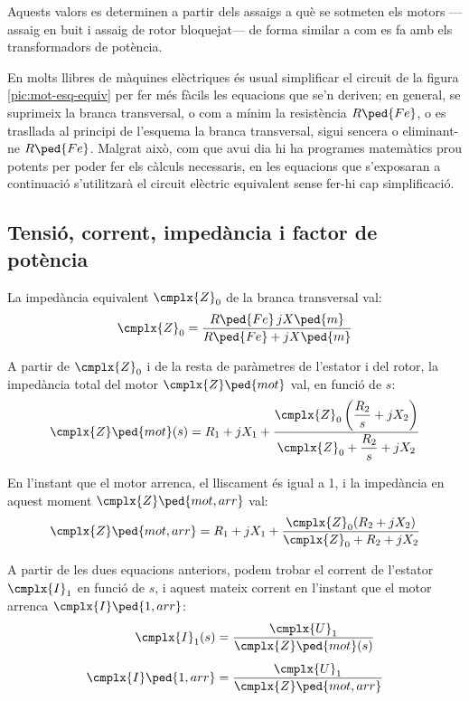 Aquests valors es determinen a partir dels assaigs a què se sotmeten els motors ---assaig en buit i assaig de rotor bloquejat--- de forma similar a com es fa amb els transformadors de potència.

En molts llibres de màquines elèctriques és usual simplificar el circuit de la figura  \vref{pic:mot-esq-equiv} per fer més fàcils les equacions que se'n deriven; en general, se suprimeix la branca transversal, o com a mínim la resistència $R\ped{Fe}$, o es trasllada al principi de l'esquema la branca transversal, sigui sencera o eliminant-ne  $R\ped{Fe}$. Malgrat això, com que avui dia hi ha programes matemàtics prou potents per poder fer els càlculs necessaris, en les equacions que s'exposaran a continuació s'utilitzarà el circuit elèctric equivalent sense fer-hi cap simplificació.

\subsection{Tensió, corrent, impedància i factor de potència}\label{sec:mot-u-c-i}

La impedància equivalent $\cmplx{Z}_0$ de la branca transversal val:
\begin{equation}\label{eq:mot-Z0}
    \cmplx{Z}_0 = \frac{R\ped{Fe} \, j X\ped{m}}{ R\ped{Fe} + j X\ped{m}}
\end{equation}

A partir de $\cmplx{Z}_0$ i de la resta de paràmetres de l'estator i del rotor, la impedància total del motor $\cmplx{Z}\ped{mot}$ val,  en funció de $s$:
\begin{equation}\label{eq:mot-Zmot}\index{motors d'inducció!impedància}
    \cmplx{Z}\ped{mot}(s) = R_1 + j X_1 + \frac{\cmplx{Z}_0 \left( \dfrac{R_2}{s} + j X_2\right)}{\cmplx{Z}_0 +  \dfrac{R_2}{s} + j X_2}
\end{equation}

En l'instant que el motor arrenca, el lliscament és igual a 1, i la impedància en aquest moment $\cmplx{Z}\ped{mot,arr}$ val:
\begin{equation}\label{eq:z-mot-arr}
    \cmplx{Z}\ped{mot,arr} = R_1 + j X_1 + \frac{\cmplx{Z}_0 ( R_2 + j X_2)}{\cmplx{Z}_0 +  R_2 + j X_2}
\end{equation}

A partir de les dues equacions anteriors, podem trobar el corrent de l'estator  $\cmplx{I}_1$ en funció de $s$, i aquest mateix corrent en l'instant que el motor arrenca $\cmplx{I}\ped{1,arr}$:
\begin{subequations}\index{motors d'inducció!corrent d'arrencada}\index{motors d'inducció!corrent}
\begin{align}
    \cmplx{I}_1(s) &= \frac{\cmplx{U}_1}{\cmplx{Z}\ped{mot}(s)}\label{eq:I1-mot} \\[1ex]
    \cmplx{I}\ped{1,arr} &= \frac{\cmplx{U}_1}{\cmplx{Z}\ped{mot,arr}}\label{eq:I1-mot-arr}
\end{align}
\end{subequations}

